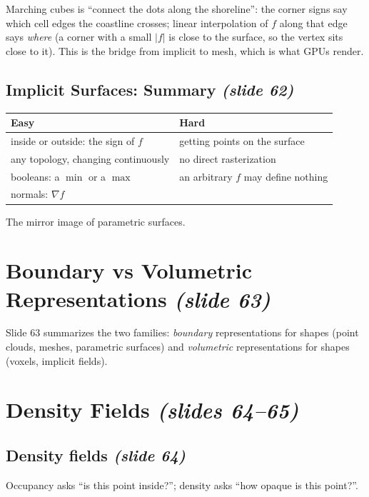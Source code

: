 \documentclass[11pt,a4paper]{article}
\theoremstyle{definition}
\theoremstyle{plain}
\theoremstyle{remark}
\newcommand{\slides}[1]{\texorpdfstring{\emph{(#1)}}{(#1)}}
\begin{document}
\begin{intuition}
Marching cubes is ``connect the dots along the shoreline'': the corner signs say which cell edges the coastline crosses; linear interpolation of $f$ along that edge says \emph{where} (a corner with a small $|f|$ is close to the surface, so the vertex sits close to it). This is the bridge from implicit to mesh, which is what GPUs render.
\end{intuition}

\subsection{Implicit Surfaces: Summary \slides{slide 62}}
\begin{center}
\begin{tabular}{L{6.6cm}L{6.6cm}}
\toprule
\textbf{Easy} & \textbf{Hard}\\
\midrule
inside or outside: the sign of $f$ & getting points on the surface\\
any topology, changing continuously & no direct rasterization\\
booleans: a $\min$ or a $\max$ & an arbitrary $f$ may define nothing\\
normals: $\nabla f$ & \\
\bottomrule
\end{tabular}
\end{center}
The mirror image of parametric surfaces.

\section{Boundary vs Volumetric Representations \slides{slide 63}}
Slide 63 summarizes the two families: \emph{boundary} representations for shapes (point clouds, meshes, parametric surfaces) and \emph{volumetric} representations for shapes (voxels, implicit fields).

\section{Density Fields \slides{slides 64--65}}
\subsection{Density fields \slides{slide 64}}
Occupancy asks ``is this point inside?''; density asks ``how opaque is this point?''.
\end{document}
